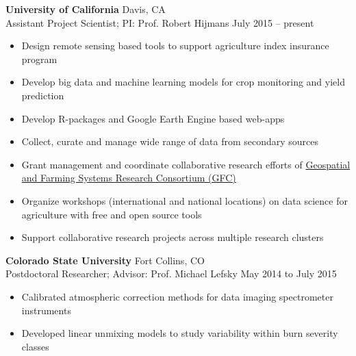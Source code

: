 \documentclass[11pt]{article}
\newenvironment{innerlist}[1][\enskip\textbullet]%
{\begin{itemize}[#1,leftmargin=*,parsep=0pt,itemsep=0pt,topsep=0pt,partopsep=0pt]}
{\end{itemize}}
\begin{document}
\textbf{University of California} \hfill {Davis, CA}\\
Assistant Project Scientist; PI: Prof. Robert Hijmans \hfill{July 2015 -- present}
\vspace{.05in}
\begin{innerlist}
        \item Design remote sensing based tools to support agriculture index insurance program
        \item Develop big data and machine learning models for crop monitoring and yield prediction
        \item Develop R-packages and Google Earth Engine based web-apps
        \item Collect, curate and manage wide range of data from secondary sources
        \item Grant management and coordinate collaborative research efforts of \href{gfc.ucdavis.edu}{Geospatial \newline and Farming Systems Research Consortium (GFC)}
        \item Organize workshops (international and national locations) on data science for \newline agriculture with free and open source tools
        \item Support collaborative research projects across multiple research clusters
\end{innerlist}

\vspace{.1in}

\textbf{Colorado State University} \hfill {Fort Collins, CO}\\
Postdoctoral Researcher; Advisor: Prof. Michael Lefsky \hfill {May 2014 to July 2015}
\vspace{.05in}
\begin{innerlist}
        \item Calibrated atmospheric correction methods for data imaging spectrometer instruments
        \item Developed linear unmixing models to study variability within burn severity classes 
\end{innerlist}

\vspace{.1in}
\end{document}
